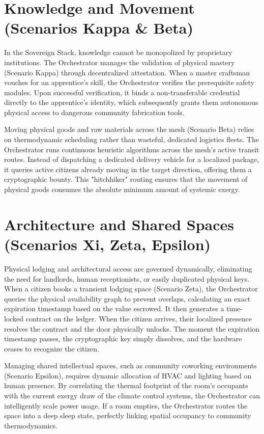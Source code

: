 \section{Knowledge and Movement (Scenarios Kappa \& Beta)}
In the Sovereign Stack, knowledge cannot be monopolized by proprietary institutions. The Orchestrator manages the validation of physical mastery (Scenario Kappa) through decentralized attestation. When a master craftsman vouches for an apprentice's skill, the Orchestrator verifies the prerequisite safety modules. Upon successful verification, it binds a non-transferable credential directly to the apprentice's identity, which subsequently grants them autonomous physical access to dangerous community fabrication tools.

Moving physical goods and raw materials across the mesh (Scenario Beta) relies on thermodynamic scheduling rather than wasteful, dedicated logistics fleets. The Orchestrator runs continuous heuristic algorithms across the mesh's active transit routes. Instead of dispatching a dedicated delivery vehicle for a localized package, it queries active citizens already moving in the target direction, offering them a cryptographic bounty. This "hitchhiker" routing ensures that the movement of physical goods consumes the absolute minimum amount of systemic exergy.

\section{Architecture and Shared Spaces (Scenarios Xi, Zeta, Epsilon)}
Physical lodging and architectural access are governed dynamically, eliminating the need for landlords, human receptionists, or easily duplicated physical keys. When a citizen books a transient lodging space (Scenario Zeta), the Orchestrator queries the physical availability graph to prevent overlaps, calculating an exact expiration timestamp based on the value escrowed. It then generates a time-locked contract on the ledger. When the citizen arrives, their localized presence resolves the contract and the door physically unlocks. The moment the expiration timestamp passes, the cryptographic key simply dissolves, and the hardware ceases to recognize the citizen.

Managing shared intellectual spaces, such as community coworking environments (Scenario Epsilon), requires dynamic allocation of HVAC and lighting based on human presence. By correlating the thermal footprint of the room's occupants with the current exergy draw of the climate control systems, the Orchestrator can intelligently scale power usage. If a room empties, the Orchestrator routes the space into a deep sleep state, perfectly linking spatial occupancy to community thermodynamics.
